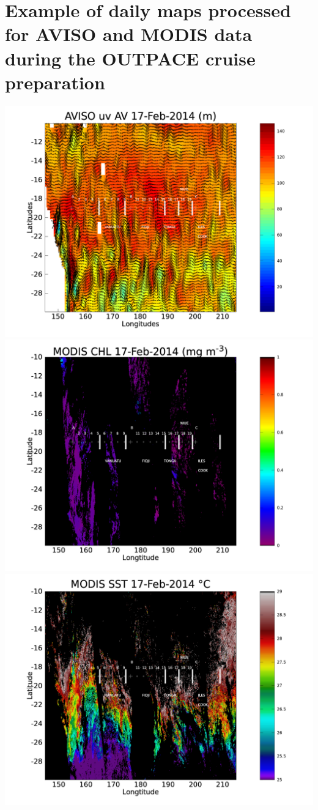 \documentclass[12pt,a4paper]{article}
\begin{document}
\appendix
\section{Example of daily maps processed for AVISO and MODIS data during the OUTPACE cruise preparation}

\includegraphics[scale=0.18]{Figures/20140217_AVISO_d0_uv.png}
\includegraphics[scale=0.18]{Figures/20140217_MODIS_CHL.png}
\includegraphics[scale=0.18]{Figures/20140217_MODIS_SST.png}
\end{document}
